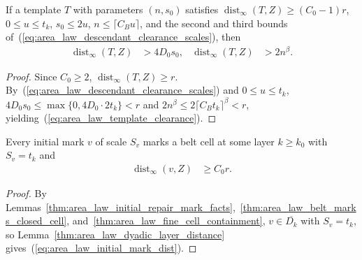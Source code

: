 \begin{lemma}
    \label{thm:area_law_template_clearance_of_endpoint_distance}
    \leanok
    If a template $T$ with parameters $(n,s_0)$ satisfies
    $\operatorname{dist}_\infty(T,Z)\ge(C_0-1)r$, $0\le u\le t_k$, $s_0\le2u$,
    $n\le\lceil C_Bu\rceil$, and the second and third bounds of~(\ref{eq:area_law_descendant_clearance_scales}),
    then
    \begin{align}
        \operatorname{dist}_\infty(T,Z) & >4D_0s_0,  &
        \operatorname{dist}_\infty(T,Z) & >2n^\beta.
        \label{eq:area_law_template_clearance}
    \end{align}
\end{lemma}
\begin{proof}\leanok
    Since $C_0\ge2$, $\operatorname{dist}_\infty(T,Z)\ge r$. By~(\ref{eq:area_law_descendant_clearance_scales})
    and $0\le u\le t_k$, $4D_0s_0\le\max\{0,4D_0\cdot2t_k\}<r$ and
    $2n^\beta\le2\lceil C_Bt_k\rceil^\beta<r$, yielding~(\ref{eq:area_law_template_clearance}).
\end{proof}

\begin{lemma}
    \label{thm:area_law_initial_mark_endpoint_distance}
    \leanok
    Every initial mark $v$ of scale $S_v$ marks a belt cell at some layer
    $k\ge k_0$ with $S_v=t_k$ and
    \begin{align}
        \operatorname{dist}_\infty(v,Z) & \ge C_0r.
        \label{eq:area_law_initial_mark_dist}
    \end{align}
\end{lemma}
\begin{proof}\leanok
    By Lemmas~\ref{thm:area_law_initial_repair_mark_facts},~\ref{thm:area_law_belt_marks_closed_cell},
    and~\ref{thm:area_law_fine_cell_containment}, $v\in\overline{D_k}$ with
    $S_v=t_k$, so Lemma~\ref{thm:area_law_dyadic_layer_distance} gives~(\ref{eq:area_law_initial_mark_dist}).
\end{proof}

